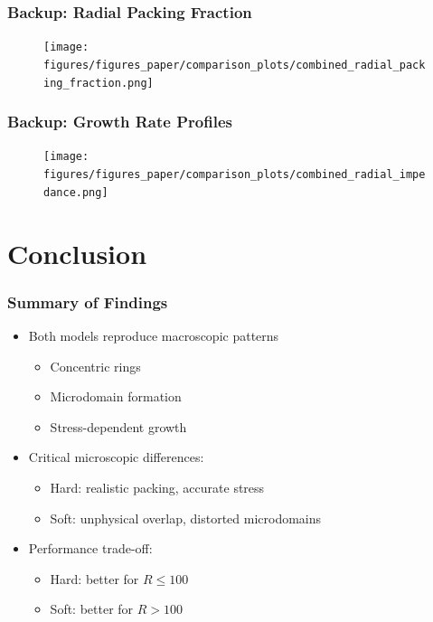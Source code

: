 \documentclass[
	10pt,
	t
]{beamer}
\begin{document}
\begin{frame}
    \frametitle{Backup: Radial Packing Fraction}

    \begin{figure}
        \centering
        \texttt{[image: figures/figures\_paper/comparison\_plots/combined\_radial\_packing\_fraction.png]}
    \end{figure}

\end{frame}

\begin{frame}
    \frametitle{Backup: Growth Rate Profiles}

    \begin{figure}
        \centering
        \texttt{[image: figures/figures\_paper/comparison\_plots/combined\_radial\_impedance.png]}
    \end{figure}

\end{frame}

\section{Conclusion}

\begin{frame}
    \frametitle{Summary of Findings}

    \begin{itemize}
        \item Both models reproduce macroscopic patterns
              \begin{itemize}
                  \item Concentric rings
                  \item Microdomain formation
                  \item Stress-dependent growth
              \end{itemize}
        \item Critical microscopic differences:
              \begin{itemize}
                  \item Hard: realistic packing, accurate stress
                  \item Soft: unphysical overlap, distorted microdomains
              \end{itemize}
        \item Performance trade-off:
              \begin{itemize}
                  \item Hard: better for $R \leq 100$
                  \item Soft: better for $R > 100$
              \end{itemize}
    \end{itemize}

\end{frame}
\end{document}
